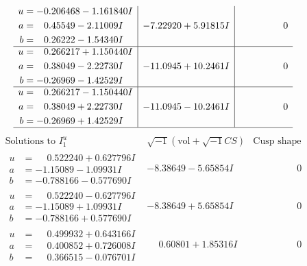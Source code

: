 \documentclass[1p]{elsarticle_modified}
\theoremstyle{definition}
\newcommand{\I}{\sqrt{-1}}
\begin{document}
$$\begin{array}{c|c|c}
\begin{aligned}
u &= -0.206468 - 1.161840 I \\
a &= \phantom{-}0.45549 - 2.11009 I \\
b &= \phantom{-}0.26222 - 1.54340 I\end{aligned}
 & -7.22920 + 5.91815 I & \phantom{-0.000000 } 0 \\ \hline\begin{aligned}
u &= \phantom{-}0.266217 + 1.150440 I \\
a &= \phantom{-}0.38049 - 2.22730 I \\
b &= -0.26969 - 1.42529 I\end{aligned}
 & -11.0945 + 10.2461 I & \phantom{-0.000000 } 0 \\ \hline\begin{aligned}
u &= \phantom{-}0.266217 - 1.150440 I \\
a &= \phantom{-}0.38049 + 2.22730 I \\
b &= -0.26969 + 1.42529 I\end{aligned}
 & -11.0945 - 10.2461 I & \phantom{-0.000000 } 0\\
 \hline 
 \end{array}$$\newpage$$\begin{array}{c|c|c}  
\text{Solutions to }I^u_{1}& \I (\text{vol} + \sqrt{-1}CS) & \text{Cusp shape}\\
 \hline 
\begin{aligned}
u &= \phantom{-}0.522240 + 0.627796 I \\
a &= -1.15089 - 1.09931 I \\
b &= -0.788166 - 0.577690 I\end{aligned}
 & -8.38649 - 5.65854 I & \phantom{-0.000000 } 0 \\ \hline\begin{aligned}
u &= \phantom{-}0.522240 - 0.627796 I \\
a &= -1.15089 + 1.09931 I \\
b &= -0.788166 + 0.577690 I\end{aligned}
 & -8.38649 + 5.65854 I & \phantom{-0.000000 } 0 \\ \hline\begin{aligned}
u &= \phantom{-}0.499932 + 0.643166 I \\
a &= \phantom{-}0.400852 + 0.726008 I \\
b &= \phantom{-}0.366515 - 0.076701 I\end{aligned}
 & \phantom{-}0.60801 + 1.85316 I & \phantom{-0.000000 } 0 \\ \hline\begin{aligned}

\end{aligned}
\end{array}$$
\end{document}
